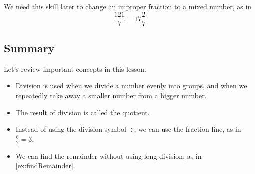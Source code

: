 We need this skill later to change an improper fraction to a mixed number, as in
\[ \frac{121}{7}=17 \frac{2}{7} \]

\subsection{Summary}
Let's review important concepts in this lesson.
\begin{itemize}
\item Division is used when we divide a number evenly into groups, and when we repeatedly take away a smaller number from a bigger number.
\item The result of division is called the quotient.
\item Instead of using the division symbol $\div$, we can use the fraction line, as in $\frac{6}{2}=3$.
\item We can find the remainder without using long division, as in \cref{ex:findRemainder}.
\end{itemize}
